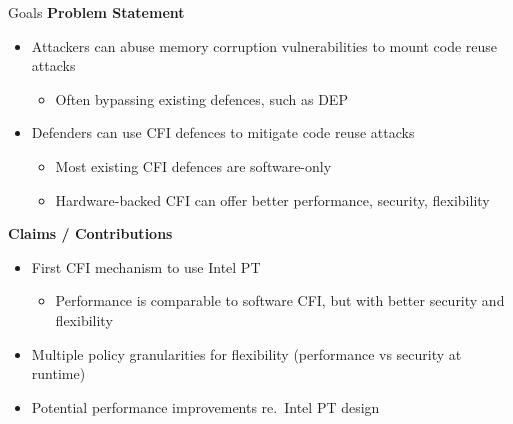 \documentclass[12pt, dvipsnames, aspectratio=169]{beamer}
\begin{document}
\begin{frame}[c]{Goals}{}
  {\bf Problem Statement}
  \begin{itemize}
    \item Attackers can abuse memory corruption vulnerabilities to mount code reuse attacks
    \begin{itemize}
      \item Often bypassing existing defences, such as DEP
    \end{itemize}
    \item Defenders can use CFI defences to mitigate code reuse attacks
    \begin{itemize}
      \item Most existing CFI defences are software-only
      \item Hardware-backed CFI can offer better performance, security, flexibility
    \end{itemize}
  \end{itemize}

  \vfill
  {\bf Claims / Contributions}
  \begin{itemize}
    \item First CFI mechanism to use Intel PT
    \begin{itemize}
      \item Performance is comparable to software CFI, but with better security and flexibility
    \end{itemize}
    \item Multiple policy granularities for flexibility (performance vs security at runtime)
    \item Potential performance improvements re.~Intel PT design
  \end{itemize}
\end{frame}
\end{document}

